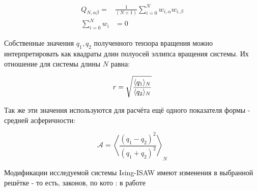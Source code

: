 \begin{align}\label{eq:Ten_G_C}
    Q_{N,\alpha\beta} = &\frac{1}{(N+1)} \sum_{i=0}^{N} w_{i, \alpha} w_{i, \beta} \\
    \sum^{N}_{i=0}w_{i} &= 0
\end{align}

Собственные значения $q_1, q_2$ полученного тензора вращения можно интерпретировать как квадраты длин полуосей эллипса вращения системы.
Их отношение для системы длины $N$ равна:

\begin{equation}
r = \sqrt{\frac{\langle q_1 \rangle_N}{\langle q_2 \rangle_N}}
\end{equation}

Так же эти значения используются для расчёта ещё одного показателя формы -
средней асферичности:

\begin{equation}
\label{eq:Asphericity}
    \mathcal{A} = \left\langle \frac{(q_{1} - q_{2})^{2}}{(q_{1} + q_{2})^{2}} \right\rangle_{N}
\end{equation}

Модификации исследуемой системы Ising-ISAW имеют изменения в выбранной решётке - то есть, законов, по кото
: в работе





